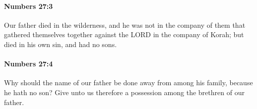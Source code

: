 		\paragraph{Numbers 27:3} %
			\label{NUMBERS-27-3}

			Our father died in the wilderness, and he was not in the company of them that gathered themselves together against the LORD in the company of Korah; but died in his own sin, and had no sons.


		\paragraph{Numbers 27:4} %
			\label{NUMBERS-27-4}

			Why should the name of our father be done away from among his family, because he hath no son? Give unto us therefore a possession among the brethren of our father.


